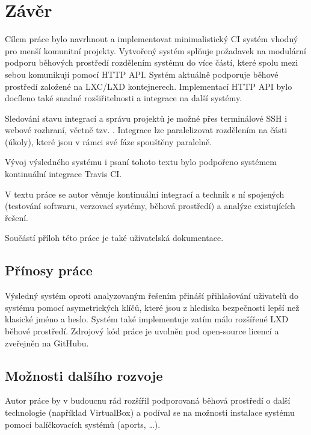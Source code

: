 \chapter{Závěr}

Cílem práce bylo navrhnout a implementovat minimalistický CI systém vhodný pro menší komunitní projekty.
Vytvořený systém splňuje požadavek na modulární podporu běhových prostředí rozdělením systému do více částí, které spolu mezi sebou komunikují pomocí HTTP API.
Systém aktuálně podporuje běhové prostředí založené na LXC/LXD kontejnerech.
Implementací HTTP API bylo docíleno také snadné rozšiřitelnosti a integrace na další systémy.

Sledování stavu integrací a správu projektů je možné přes terminálové SSH i webové rozhraní, včetně tzv. .
Integrace lze paralelizovat rozdělením na části (úkoly), které jsou v rámci své fáze spouštěny paralelně.

Vývoj výsledného systému i psaní tohoto textu bylo podpořeno systémem kontinuální integrace Travis CI.

V textu práce se autor věnuje kontinuální integrací a technik s ní spojených (testování softwaru, verzovací systémy, běhová prostředí) a analýze existujících řešení.

Součástí příloh této práce je také uživatelská dokumentace.

\section{Přínosy práce}

Výsledný systém oproti analyzovaným řešením přináší přihlašování uživatelů do systému pomocí asymetrických klíčů, které jsou z hlediska bezpečnosti lepší než klasické jméno a heslo.
Systém také implementuje zatím málo rozšířené LXD běhové prostředí.
Zdrojový kód práce je uvolněn pod open-source licencí a zveřejněn na GitHubu.

\section{Možnosti dalšího rozvoje}

Autor práce by v budoucnu rád rozšířil podporovaná běhová prostředí o další technologie (například VirtualBox) a podíval se na možnosti instalace systému pomocí balíčkovacích systémů (aports, \ldots).